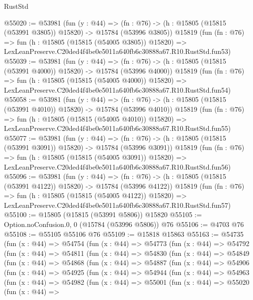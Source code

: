 \begin{lexlean}{RustStd}
\begin{coremodule}
@55020 := @53981
    (fun (y : @44) =>
    (fn : @76) -> (h : @15805 (@15815 (@53991 @3805)) @15820) -> @15784 (@53996 @3805))
    @15819
    (fun (fn : @76) =>
    fun (h : @15805 (@15815 (@54005 @3805)) @15820) =>
    LexLeanPreserve.C20ded4f4be0e5011a640fb6c30888a67.R10.RustStd.fun53)
@55039 := @53981
    (fun (y : @44) =>
    (fn : @76) -> (h : @15805 (@15815 (@53991 @4000)) @15820) -> @15784 (@53996 @4000))
    @15819
    (fun (fn : @76) =>
    fun (h : @15805 (@15815 (@54005 @4000)) @15820) =>
    LexLeanPreserve.C20ded4f4be0e5011a640fb6c30888a67.R10.RustStd.fun54)
@55058 := @53981
    (fun (y : @44) =>
    (fn : @76) -> (h : @15805 (@15815 (@53991 @4010)) @15820) -> @15784 (@53996 @4010))
    @15819
    (fun (fn : @76) =>
    fun (h : @15805 (@15815 (@54005 @4010)) @15820) =>
    LexLeanPreserve.C20ded4f4be0e5011a640fb6c30888a67.R10.RustStd.fun55)
@55077 := @53981
    (fun (y : @44) =>
    (fn : @76) -> (h : @15805 (@15815 (@53991 @3091)) @15820) -> @15784 (@53996 @3091))
    @15819
    (fun (fn : @76) =>
    fun (h : @15805 (@15815 (@54005 @3091)) @15820) =>
    LexLeanPreserve.C20ded4f4be0e5011a640fb6c30888a67.R10.RustStd.fun56)
@55096 := @53981
    (fun (y : @44) =>
    (fn : @76) -> (h : @15805 (@15815 (@53991 @4122)) @15820) -> @15784 (@53996 @4122))
    @15819
    (fun (fn : @76) =>
    fun (h : @15805 (@15815 (@54005 @4122)) @15820) =>
    LexLeanPreserve.C20ded4f4be0e5011a640fb6c30888a67.R10.RustStd.fun57)
@55100 := @15805 (@15815 (@53991 @5806)) @15820
@55105 := Option.noConfusion.{0, 0} (@15784 (@53996 @5806)) @76
@55106 := @4703 @76
@55108 := @55105 @55106 @76
@55109 := @15818 @15863
@55163 := @54735
    (fun (x : @44) =>
    @54754
      (fun (x : @44) =>
      @54773
        (fun (x : @44) =>
        @54792
          (fun (x : @44) =>
          @54811
            (fun (x : @44) =>
            @54830
              (fun (x : @44) =>
              @54849
                (fun (x : @44) =>
                @54868
                  (fun (x : @44) =>
                  @54887
                    (fun (x : @44) =>
                    @54906
                      (fun (x : @44) =>
                      @54925
                        (fun (x : @44) =>
                        @54944
                          (fun (x : @44) =>
                          @54963
                            (fun (x : @44) =>
                            @54982
                              (fun (x : @44) =>
                              @55001
                                (fun (x : @44) =>
                                @55020
                                  (fun (x : @44) =>

\end{coremodule}
\end{lexlean}
